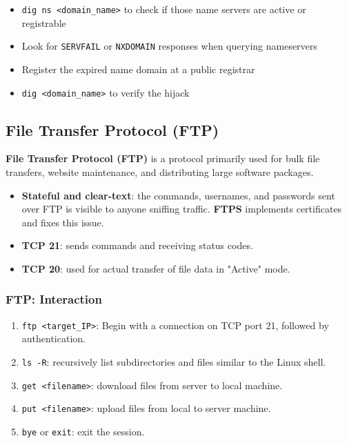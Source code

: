 \documentclass[12pt, letterpaper]{article}
\begin{document}
\begin{itemize}
    \item \texttt{dig ns <domain\_name>} to check if those name servers are active or registrable
    \item Look for \texttt{SERVFAIL} or \texttt{NXDOMAIN} responses when querying nameservers
    \item Register the expired name domain at a public registrar
    \item \texttt{dig <domain\_name>} to verify the hijack
\end{itemize}

\subsection*{File Transfer Protocol (FTP)}

\textbf{File Transfer Protocol (FTP)} is a protocol primarily used for bulk file transfers, website maintenance, and distributing large software packages.

\begin{itemize}
    \item \textbf{Stateful and clear-text}: the commands, usernames, and passwords sent over FTP is visible to anyone sniffing traffic. \textbf{FTPS} implements certificates and fixes this issue.
    \item \textbf{TCP 21}: sends commands and receiving status codes.
    \item \textbf{TCP 20}: used for actual transfer of file data in "Active" mode.
\end{itemize}

\subsubsection*{FTP: Interaction}

\begin{enumerate}
    \item \texttt{ftp <target\_IP>}: Begin with a connection on TCP port 21, followed by authentication.
    \item \texttt{ls -R}: recursively list subdirectories and files similar to the Linux shell.
    \item \texttt{get <filename>}: download files from server to local machine.
    \item \texttt{put <filename>}: upload files from local to server machine.
    \item \texttt{bye} or \texttt{exit}: exit the session.
\end{enumerate}
\end{document}
